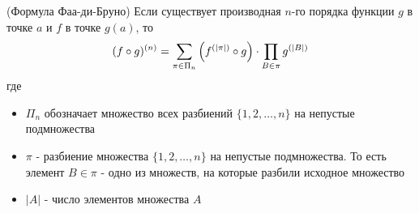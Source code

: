 \begin{theorem} (Формула Фаа-ди-Бруно)
	Если существует производная $n$-го порядка функции $g$ в точке $a$ и $f$ в точке $g(a)$, то
	\[
		(f \circ g)^{(n)} = \sum\limits_{\pi \in \Pi_n} \left(f^{(|\pi|)} \circ g\right) \cdot \prod\limits_{B \in \pi} g^{(|B|)}
	\]
	где 
	\begin{itemize}
		\item $\Pi_n$ обозначает множество всех разбиений $\{1, 2, \dots, n\}$ на непустые подмножества
		
		\item $\pi$ - разбиение множества $\{1, 2, \ldots, n\}$ на непустые подмножества. То есть элемент $B \in \pi$ - одно из множеств, на которые разбили исходное множество
		
		\item $|A|$ - число элементов множества $A$
	\end{itemize}
\end{theorem}

